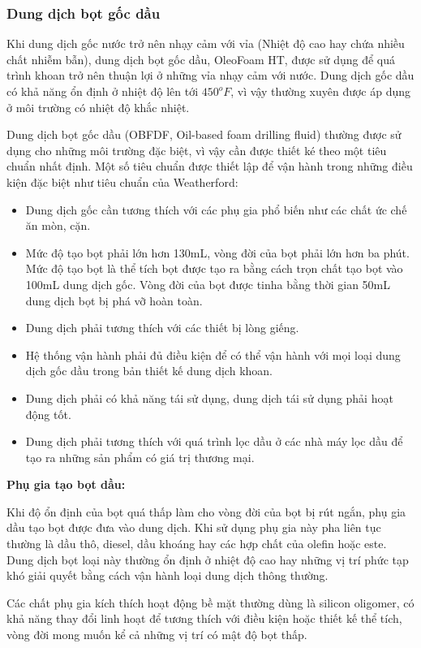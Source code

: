 \documentclass[13pt,a4paper]{article}
\begin{document}
	\subsubsection{Dung dịch bọt gốc dầu}
	Khi dung dịch gốc nước trở nên nhạy cảm với vỉa (Nhiệt độ cao hay chứa nhiều chất nhiễm bẫn), dung dịch bọt gốc dầu, OleoFoam HT, được sử dụng để quá trình khoan trở nên thuận lợi ở những vỉa nhạy cảm với nước. Dung dịch gốc dầu có khả năng ổn định ở nhiệt độ lên tới $450^oF$, vì vậy thường xuyên được áp dụng ở môi trường có nhiệt độ khắc nhiệt.\par
	Dung dịch bọt gốc dầu (OBFDF, Oil-based foam drilling fluid) thường được sử dụng cho những môi trường đặc biệt, vì vậy cần được thiết ké theo một tiêu chuẩn nhất định. Một số tiêu chuẩn được thiết lập để vận hành trong những điều kiện đặc biệt như tiêu chuẩn của Weatherford:
	\begin{itemize}
		\item Dung dịch gốc cần tương thích với các phụ gia phổ biến như các chất ức chế ăn mòn, cặn.
		\item Mức độ tạo bọt phải lớn hơn 130mL, vòng đời của bọt phải lớn hơn ba phút. Mức độ tạo bọt là thể tích bọt được tạo ra bằng cách trọn chất tạo bọt vào 100mL dung dịch gốc. Vòng đời của bọt được tinha bằng thời gian 50mL dung dịch bọt bị phá vỡ hoàn toàn.
		\item Dung dịch phải tương thích với các thiết bị lòng giếng.
		\item Hệ thống vận hành phải đủ điều kiện để có thể vận hành với mọi loại dung dịch gốc dầu trong bản thiết kế dung dịch khoan.
		\item Dung dịch phải có khả năng tái sử dụng, dung dịch tái sử dụng phải hoạt động tốt.
		\item Dung dịch phải tương thích với quá trình lọc dầu ở các nhà máy lọc dầu để tạo ra những sản phẩm có giá trị thương mại.
	\end{itemize}
	\par
	\textbf{Phụ gia tạo bọt dầu:}\par
	Khi độ ổn định của bọt quá thấp làm cho vòng đời của bọt bị rút ngắn, phụ gia dầu tạo bọt được đưa vào dung dịch. Khi sử dụng phụ gia này pha liên tục thường là dầu thô, diesel, dầu khoáng hay các hợp chất của olefin hoặc este. Dung dịch bọt loại này thường ổn định ở nhiệt độ cao hay những vị trí phức tạp khó giải quyết bằng cách vận hành loại dung dịch thông thường.\par
	Các chất phụ gia kích thích hoạt động bề mặt thường dùng là silicon oligomer, có khả năng thay đổi linh hoạt để tương thích với điều kiện hoặc thiết kế thể tích, vòng đời mong muốn kể cả những vị trí có mật độ bọt thấp.\par
\end{document}
